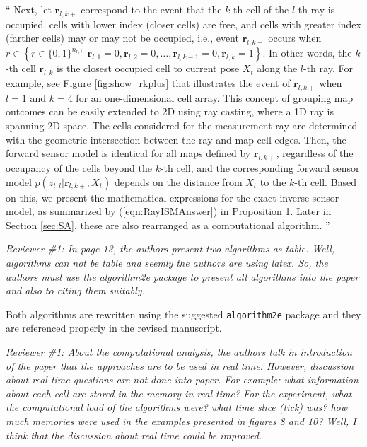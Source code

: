 \documentclass[11pt]{article}
\newcommand{\braces}[1]{\ensuremath{\left\{ #1 \right\}}}
\newcommand{\refeqn}[1]{(\ref{eqn:#1})}
\newenvironment{correction}{\begin{list}{}{\setlength{\leftmargin}{1cm}\setlength{\rightmargin}{1cm}}\vspace{\parsep}\item[]``}{''\end{list}}
\begin{document}
\begin{enumerate}
\begin{correction}
Next, let $\mathbf{r}_{l,k+}$ correspond to the event that the $k$-th cell of the $l$-th ray is occupied, cells with lower index (closer cells) are free, and cells with greater index (farther cells) may or may not be occupied, i.e., event $\mathbf{r}_{l,k+}$ occurs when \\$r\in\braces{r\in\{0,1\}^{{n_{r,l}}}\,|\mathbf{r}_{l,1}=0,\mathbf{r}_{l,2}=0,\ldots,\mathbf{r}_{l,k-1}=0,\mathbf{r}_{l,k}=1}$. In other words, the $k$-th cell $\mathbf{r}_{l,k}$ is the closest occupied cell to current pose $X_t$ along the $l$-th ray. For example, see Figure \ref{fig:show_rkplus} that illustrates the event of $\mathbf{r}_{l,k+}$ when $l=1$ and $k=4$ for an one-dimensional cell array. This concept of grouping map outcomes can be easily extended to 2D using ray casting, where a 1D ray is spanning 2D space. The cells considered for the measurement ray are determined with the geometric intersection between the ray and map cell edges.
Then, the forward sensor model is identical for all maps defined by $\mathbf{r}_{l,k+}$, regardless of the occupancy of the cells beyond the $k$-th cell, and the corresponding forward sensor model $p(z_{t,l}|\mathbf{r}_{l,k+},X_{t})$ depends on the distance from $X_t$ to the $k$-th cell. Based on this, we present the mathematical expressions for the exact inverse sensor model, as summarized by \refeqn{RayISMAnswer} in Proposition 1. Later in Section \ref{sec:SA}, these are also rearranged as a computational algorithm. 
\end{correction}


\item {\itshape Reviewer \#1: In page 13, the authors present two algorithms as table. Well, algorithms can not be table and seemly the authors are using latex. So, the authors must use the  algorithm2e package to present all algorithms into the paper and also to citing them suitably.}

Both algorithms are rewritten using the suggested \texttt{algorithm2e} package and they are referenced properly in the revised manuscript. 

\item {\itshape Reviewer \#1: About the computational analysis, the authors talk in introduction of the paper that the approaches are to be used in real time. However, discussion about real time questions are not done into paper. For example: what information about each cell are stored in the memory in real time? For the experiment, what the computational load of the algorithms were? what time slice (tick) was? how much memories were used in the examples presented in figures 8 and 10? Well, I think that the discussion about real time could be improved.}\\


\end{enumerate}
\end{document}
